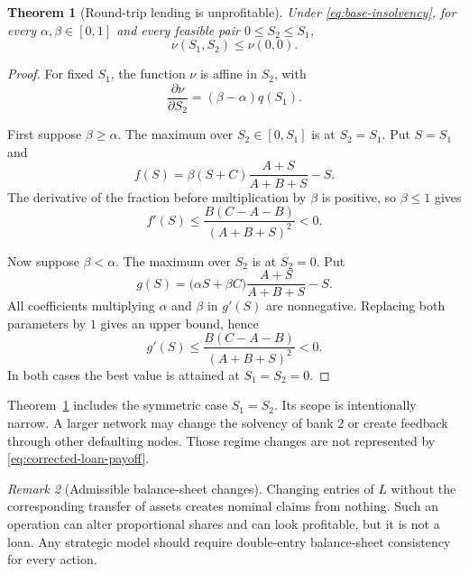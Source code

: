 \documentclass[11pt]{article}
\newtheorem{theorem}{Theorem}[section]
\theoremstyle{definition}
\theoremstyle{remark}
\newtheorem{remark}[theorem]{Remark}
\begin{document}
\begin{theorem}[Round-trip lending is unprofitable]\label{thm:round-trip}
Under \eqref{eq:base-insolvency}, for every
$\alpha,\beta\in[0,1]$ and every feasible pair
$0\leq S_2\leq S_1$,
\begin{equation}
  \nu(S_1,S_2)\leq\nu(0,0).
\end{equation}
\end{theorem}

\begin{proof}
For fixed $S_1$, the function $\nu$ is affine in $S_2$, with
\begin{equation}
  \frac{\partial\nu}{\partial S_2}
  =(\beta-\alpha)q(S_1).
\end{equation}

First suppose $\beta\geq\alpha$.  The maximum over $S_2\in[0,S_1]$ is at
$S_2=S_1$.  Put $S=S_1$ and
\begin{equation}
  f(S)=\beta(S+C)\frac{A+S}{A+B+S}-S.
\end{equation}
The derivative of the fraction before multiplication by $\beta$ is positive,
so $\beta\leq1$ gives
\begin{equation}
  f'(S)
  \leq
  \frac{B(C-A-B)}{(A+B+S)^2}<0.
\end{equation}

Now suppose $\beta<\alpha$.  The maximum over $S_2$ is at $S_2=0$.  Put
\begin{equation}
  g(S)=\bigl(\alpha S+\beta C\bigr)
       \frac{A+S}{A+B+S}-S.
\end{equation}
All coefficients multiplying $\alpha$ and $\beta$ in $g'(S)$ are
nonnegative.  Replacing both parameters by $1$ gives an upper bound, hence
\begin{equation}
  g'(S)
  \leq
  \frac{B(C-A-B)}{(A+B+S)^2}<0.
\end{equation}
In both cases the best value is attained at $S_1=S_2=0$.
\end{proof}

Theorem~\ref{thm:round-trip} includes the symmetric case $S_1=S_2$.  Its scope
is intentionally narrow.  A larger network may change the solvency of bank
$2$ or create feedback through other defaulting nodes.  Those regime changes
are not represented by \eqref{eq:corrected-loan-payoff}.

\begin{remark}[Admissible balance-sheet changes]
Changing entries of $L$ without the corresponding transfer of assets creates
nominal claims from nothing.  Such an operation can alter proportional shares
and can look profitable, but it is not a loan.  Any strategic model should
require double-entry balance-sheet consistency for every action.
\end{remark}
\end{document}
